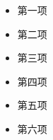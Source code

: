\documentclass{ctexbeamer}
\begin{document}
    \begin{frame}
        \begin{multicols}{2}
            \begin{itemize}
                \item 第一项
                \item 第二项
                \item 第三项
                \item 第四项
                \item 第五项
                \item 第六项
            \end{itemize}
        \end{multicols}
    \end{frame}
\end{document}
